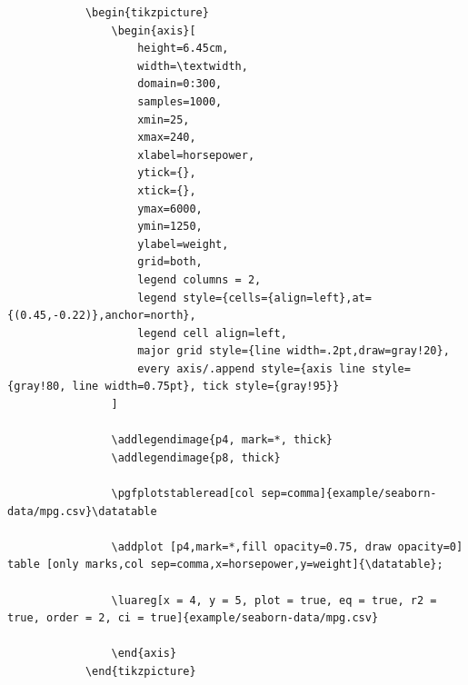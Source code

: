 \documentclass[11pt]{article}
\begin{document}
	\begin{codebox}
	    \begin{verbatim}
	        \begin{tikzpicture}
	            \begin{axis}[
	                height=6.45cm,
	                width=\textwidth,
	                domain=0:300,
	                samples=1000,
	                xmin=25,
	                xmax=240,
	                xlabel=horsepower,
	                ytick={},
	                xtick={},
	                ymax=6000,
	                ymin=1250,
	                ylabel=weight,
	                grid=both,
	                legend columns = 2,
	                legend style={cells={align=left},at={(0.45,-0.22)},anchor=north},
	                legend cell align=left,
	                major grid style={line width=.2pt,draw=gray!20},
	                every axis/.append style={axis line style={gray!80, line width=0.75pt}, tick style={gray!95}}
	            ]
	
	            \addlegendimage{p4, mark=*, thick}
	            \addlegendimage{p8, thick}
	
	            \pgfplotstableread[col sep=comma]{example/seaborn-data/mpg.csv}\datatable
	
	            \addplot [p4,mark=*,fill opacity=0.75, draw opacity=0] table [only marks,col sep=comma,x=horsepower,y=weight]{\datatable};
	
	            \luareg[x = 4, y = 5, plot = true, eq = true, r2 = true, order = 2, ci = true]{example/seaborn-data/mpg.csv}
	
	            \end{axis}
	        \end{tikzpicture}
	    \end{verbatim}
   	\end{codebox}

    \pagebreak
\end{document}

